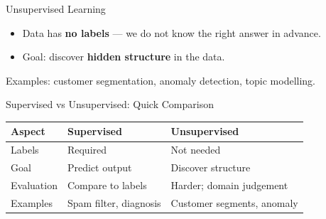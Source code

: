 \documentclass[10pt]{beamer}
\begin{document}
\begin{frame}{Unsupervised Learning}
    \begin{itemize}
        \item Data has \textbf{no labels} — we do not know the right answer in advance.
        \item Goal: discover \textbf{hidden structure} in the data.
    \end{itemize}
    \vspace{0.2cm}
    \begin{center}
    \end{center}
    \vspace{0.1cm}
    Examples: customer segmentation, anomaly detection, topic modelling.
\end{frame}

\begin{frame}{Supervised vs Unsupervised: Quick Comparison}
    \footnotesize
    \setlength{\tabcolsep}{4pt}
    \renewcommand{\arraystretch}{1.2}
    \begin{tabularx}{\textwidth}{>{\raggedright\arraybackslash}p{2.8cm} >{\raggedright\arraybackslash}X >{\raggedright\arraybackslash}X}
        \toprule
        \textbf{Aspect} & \textbf{Supervised} & \textbf{Unsupervised} \\
        \midrule
        Labels & Required & Not needed \\
        Goal & Predict output & Discover structure \\
        Evaluation & Compare to labels & Harder; domain judgement \\
        Examples & Spam filter, diagnosis & Customer segments, anomaly \\
        \bottomrule
    \end{tabularx}
\end{frame}

\end{document}
